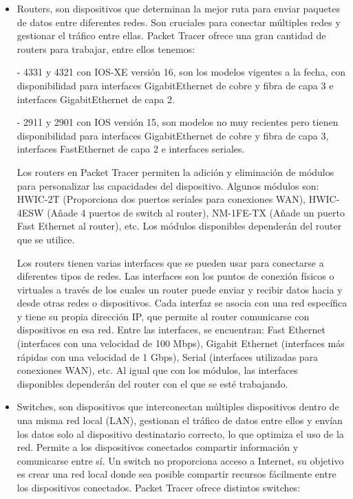 \documentclass{article}
\begin{document}
\begin{itemize}
    \item Routers, son dispositivos que determinan la mejor ruta para enviar paquetes de datos entre diferentes redes. Son cruciales para conectar múltiples redes y gestionar el tráfico entre ellas. Packet Tracer ofrece una gran cantidad de routers para trabajar, entre ellos tenemos: 

    - 4331 y 4321 con IOS-XE versión 16, son los modelos vigentes a la fecha, con disponibilidad para interfaces GigabitEthernet de cobre y fibra de capa 3 e interfaces GigabitEthernet de capa 2.

    -  2911 y 2901 con IOS versión 15, son modelos no muy recientes pero tienen disponibilidad para interfaces GigabitEthernet de cobre y fibra de capa 3, interfaces FastEthernet de capa 2 e interfaces seriales.
    
    Los routers en Packet Tracer permiten la adición y eliminación de módulos para personalizar las capacidades del dispositivo. Algunos módulos son: HWIC-2T (Proporciona dos puertos seriales para conexiones WAN), HWIC-4ESW (Añade 4 puertos de switch al router), NM-1FE-TX (Añade un puerto Fast Ethernet al router), etc. Los módulos disponibles dependerán del router que se utilice.

    Los routers tienen varias interfaces que se pueden usar para conectarse a diferentes tipos de redes. Las interfaces son los puntos de conexión físicos o virtuales a través de los cuales un router puede enviar y recibir datos hacia y desde otras redes o dispositivos. Cada interfaz se asocia con una red específica y tiene su propia dirección IP, que permite al router comunicarse con dispositivos en esa red. Entre las interfaces, se encuentran: Fast Ethernet (interfaces con una velocidad de 100 Mbps), Gigabit Ethernet (interfaces más rápidas con una velocidad de 1 Gbps), Serial (interfaces utilizadas para conexiones WAN), etc. Al igual que con los módulos, las interfaces disponibles dependerán del router con el que se esté trabajando.

    \item Switches, son dispositivos que interconectan múltiples dispositivos dentro de una misma red local (LAN), gestionan el tráfico de datos entre ellos y envían los datos solo al dispositivo destinatario correcto, lo que optimiza el uso de la red. Permite a los dispositivos conectados compartir información y comunicarse entre sí. Un switch no proporciona acceso a Internet, su objetivo es crear una red local donde sea posible compartir recursos fácilmente entre los dispositivos conectados. Packet Tracer ofrece distintos switches:
    

\end{itemize}
\end{document}
